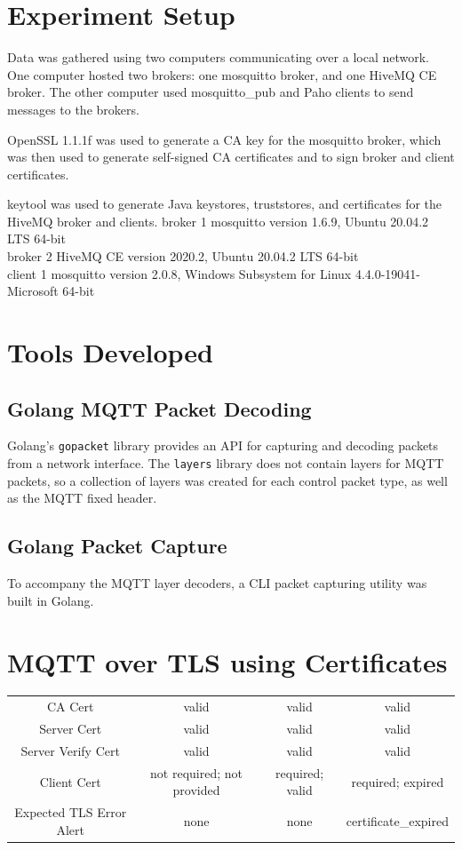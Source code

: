 \documentclass[12pt]{article}
\begin{document}
\section{Experiment Setup}
\par Data was gathered using two computers communicating over a local network. One computer hosted two brokers: one mosquitto broker, and one HiveMQ CE broker. The other computer used mosquitto\_pub and Paho clients to send messages to the brokers.\par
OpenSSL 1.1.1f was used to generate a CA key for the mosquitto broker, which was then used to generate self-signed CA certificates and to sign broker and client certificates.\par
keytool was used to generate Java keystores, truststores, and certificates for the HiveMQ broker and clients.
broker 1 mosquitto version 1.6.9, Ubuntu 20.04.2 LTS 64-bit\\
broker 2 HiveMQ CE version 2020.2, Ubuntu 20.04.2 LTS 64-bit\\
client 1 mosquitto version 2.0.8, Windows Subsystem for Linux 4.4.0-19041-Microsoft 64-bit\\


\section{Tools Developed}
\subsection{Golang MQTT Packet Decoding}
Golang's \texttt{gopacket} library provides an API for capturing and decoding packets from a network interface. The \texttt{layers} library does not contain layers for MQTT packets, so a collection of layers was created for each control packet type, as well as the MQTT fixed header. 
\subsection{Golang Packet Capture}
To accompany the MQTT layer decoders, a CLI packet capturing utility was built in Golang. 
\section{MQTT over TLS using Certificates}

\begin{tabular}{  c | c  c c}
CA Cert 			& valid & valid & valid \\
Server Cert 		& valid & valid & valid \\
Server Verify Cert & valid & valid & valid \\
Client Cert		& not required; not provided & required; valid & required; expired \\
\hline
Expected TLS Error Alert & none & none & certificate\_expired
\end{tabular}
\end{document}
